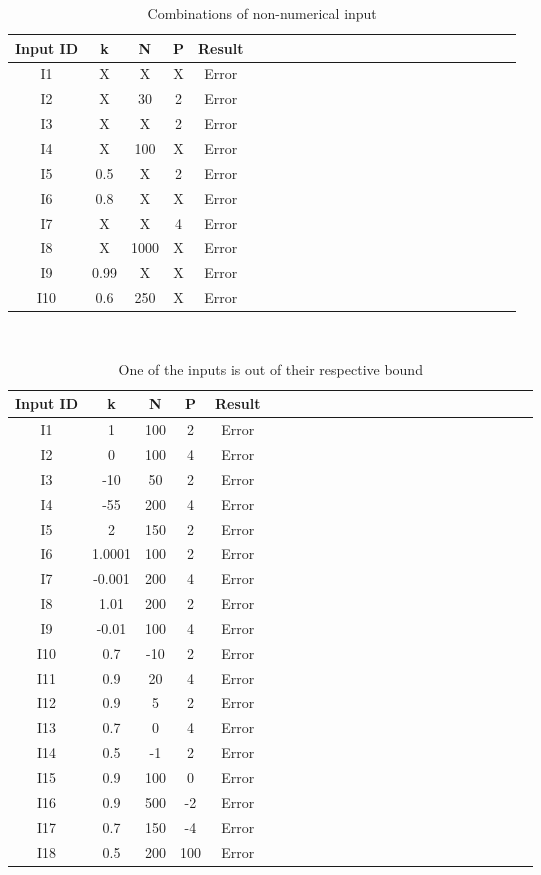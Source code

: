 \documentclass[12pt, titlepage]{article}
\begin{document}
\begin{table}[h!]
	\centering
	\begin{tabular}{|c|c|c|c|c|c|c|c|c|c|c|c|c|c|c|c|c|c|c|c|c|c|c|c|}
		\hline        
		Input ID& k& N & P & Result \\
		\hline
		I1    &X &X &X & Error \\ \hline
		I2    &X &30 &2 & Error\\ \hline 
		I3    &X &X &2 &Error \\ \hline 
		I4     &X &100 &X &Error \\ \hline
		I5     &0.5 &X & 2& Error\\ \hline
		I6    &0.8 &X &X & Error  \\ \hline
		I7      &X &X &4 & Error \\ \hline
		I8     &X &1000 &X & Error \\ \hline
		I9     &0.99 &X &X & Error \\ \hline 
		I10    &0.6 &250 &X & Error \\ 
		\hline
	\end{tabular}\\
	\caption{Combinations of non-numerical input}
	\label{Table:D_11}
\end{table} 

\begin{table}[h!]
	\centering
	\begin{tabular}{|c|c|c|c|c|c|c|c|c|c|c|c|c|c|c|c|c|c|c|c|c|c|c|c|}
		\hline        
		Input ID& k& N & P & Result \\
		\hline
		I1     &1 &100 &2 & Error \\ \hline
		I2     &0 &100 &4 & Error\\ \hline 
		I3     &-10 &50 &2 &Error \\ \hline 
		I4      &-55 &200 &4 &Error \\ \hline
		I5     &2 &150 & 2& Error\\ \hline
		I6     &1.0001 & 100 &2 & Error \\ \hline
		I7     &-0.001 & 200 &4 & Error\\ \hline 
		I8     &1.01 & 200 &2 &Error \\ \hline 
		I9      &-0.01 &100 &4 &Error \\ \hline
		I10     &0.7 & -10 &2 & Error \\ \hline
		I11     &0.9 & 20 &4 & Error\\ \hline 
		I12     &0.9 & 5 &2 &Error \\ \hline 
		I13      &0.7 &0 &4 &Error \\ \hline
		I14     &0.5 & -1 & 2& Error\\ \hline 
		I15    &0.9 & 100 &0 & Error\\ \hline 
		I16     &0.9 & 500 &-2 &Error \\ \hline 
		I17      &0.7 &150 &-4 &Error \\ \hline
		I18     &0.5 & 200 & 100& Error\\
		\hline
	\end{tabular}\\
	\caption{One of the inputs is out of their respective bound}
	\label{Table:D_12}
\end{table}  
\end{document}
